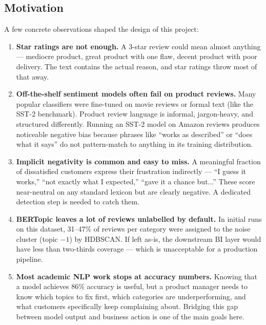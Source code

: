 \subsection{Motivation}
\begin{justify}
A few concrete observations shaped the design of this project:

\begin{enumerate}
    \item \textbf{Star ratings are not enough.} A 3-star review could mean almost anything — mediocre product, great product with one flaw, decent product with poor delivery. The text contains the actual reason, and star ratings throw most of that away.

    \item \textbf{Off-the-shelf sentiment models often fail on product reviews.} Many popular classifiers were fine-tuned on movie reviews or formal text (like the SST-2 benchmark). Product review language is informal, jargon-heavy, and structured differently. Running an SST-2 model on Amazon reviews produces noticeable negative bias because phrases like ``works as described'' or ``does what it says'' do not pattern-match to anything in its training distribution.

    \item \textbf{Implicit negativity is common and easy to miss.} A meaningful fraction of dissatisfied customers express their frustration indirectly — ``I guess it works,'' ``not exactly what I expected,'' ``gave it a chance but...'' These score near-neutral on any standard lexicon but are clearly negative. A dedicated detection step is needed to catch them.

    \item \textbf{BERTopic leaves a lot of reviews unlabelled by default.} In initial runs on this dataset, 31--47\% of reviews per category were assigned to the noise cluster (topic $-1$) by HDBSCAN. If left as-is, the downstream BI layer would have less than two-thirds coverage — which is unacceptable for a production pipeline.

    \item \textbf{Most academic NLP work stops at accuracy numbers.} Knowing that a model achieves 86\% accuracy is useful, but a product manager needs to know which topics to fix first, which categories are underperforming, and what customers specifically keep complaining about. Bridging this gap between model output and business action is one of the main goals here.
\end{enumerate}
\end{justify}

